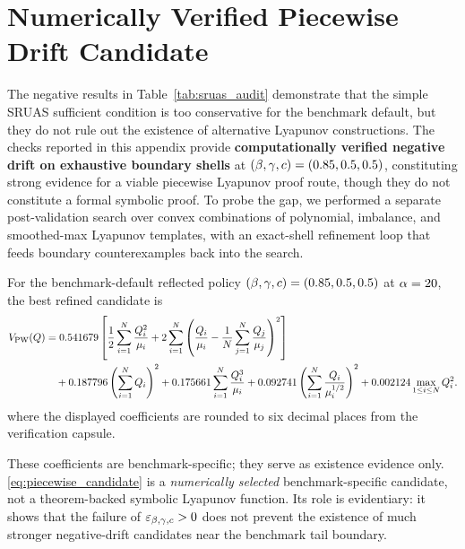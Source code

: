 \section{Numerically Verified Piecewise Drift Candidate}
\label{sec:appendix_piecewise}

The negative results in Table~\ref{tab:sruas_audit} demonstrate that the simple SRUAS sufficient condition is too conservative for the benchmark default, but they do not rule out the existence of alternative Lyapunov constructions.
The checks reported in this appendix provide \textbf{computationally verified negative drift on exhaustive boundary shells} at $(\beta,\gamma,c)=(0.85,0.5,0.5)$, constituting strong evidence for a viable piecewise Lyapunov proof route, though they do not constitute a formal symbolic proof.
To probe the gap, we performed a separate post-validation search over convex combinations of polynomial, imbalance, and smoothed-max Lyapunov templates, with an exact-shell refinement loop that feeds boundary counterexamples back into the search.

For the benchmark-default reflected policy $(\beta,\gamma,c)=(0.85,0.5,0.5)$ at $\alpha=20$, the best refined candidate is
\begin{equation}
\label{eq:piecewise_candidate}
\begin{aligned}
V_{\mathrm{PW}}(Q)
&=
0.541679
\left[
\frac12 \sum_{i=1}^{N} \frac{Q_{i}^2}{\mu_i}
+
2 \sum_{i=1}^{N}
\left(
\frac{Q_{i}}{\mu_i}
-
\frac{1}{N}\sum_{j=1}^{N}\frac{Q_{j}}{\mu_j}
\right)^2
\right] \\
&\quad
+ 0.187796 \left(\sum_{i=1}^{N}Q_{i}\right)^2
+ 0.175661 \sum_{i=1}^{N}\frac{Q_{i}^3}{\mu_i}
+ 0.092741 \left(\sum_{i=1}^{N}\frac{Q_{i}}{\mu_i^{1/2}}\right)^2
+ 0.002124 \max_{1\le i\le N}Q_{i}^2.
\end{aligned}
\end{equation}
where the displayed coefficients are rounded to six decimal places from the verification capsule.

These coefficients are benchmark-specific; they serve as existence evidence only. \cref{eq:piecewise_candidate} is a \emph{numerically selected} benchmark-specific candidate, not a theorem-backed symbolic Lyapunov function.
Its role is evidentiary: it shows that the failure of $\varepsilon_{\beta,\gamma,c}>0$ does not prevent the existence of much stronger negative-drift candidates near the benchmark tail boundary.

